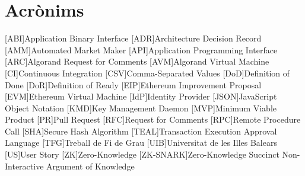 \chapter{Acrònims}
\label{ch:acronims}
%
%
\begin{acronym}

    [ABI]{Application Binary Interface}
    [ADR]{Architecture Decision Record}
    [AMM]{Automated Market Maker}
    [API]{Application Programming Interface}
    [ARC]{Algorand Request for Comments}
    [AVM]{Algorand Virtual Machine}
    [CI]{Continuous Integration}
    [CSV]{Comma-Separated Values}
    [DoD]{Definition of Done}
    [DoR]{Definition of Ready}
    [EIP]{Ethereum Improvement Proposal}
    [EVM]{Ethereum Virtual Machine}
    [IdP]{Identity Provider}
    [JSON]{JavaScript Object Notation}
    [KMD]{Key Management Daemon}
    [MVP]{Minimum Viable Product}
    [PR]{Pull Request}
    [RFC]{Request for Comments}
    [RPC]{Remote Procedure Call}
    [SHA]{Secure Hash Algorithm}
    [TEAL]{Transaction Execution Approval Language}
    [TFG]{Treball de Fi de Grau}
    [UIB]{Universitat de les Illes Balears}
    [US]{User Story}
    [ZK]{Zero-Knowledge}
    [ZK-SNARK]{Zero-Knowledge Succinct Non-Interactive Argument of Knowledge}

\end{acronym}
